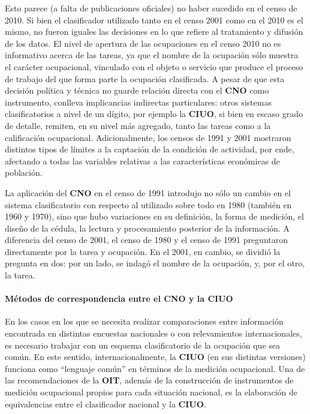 \documentclass[
]{book}
\begin{document}
Esto parece (a falta de publicaciones oficiales) no haber sucedido en el censo de 2010. Si bien el clasificador utilizado tanto en el censo 2001 como en el 2010 es el mismo, no fueron iguales las decisiones en lo que refiere al tratamiento y difusión de los datos. El nivel de apertura de las ocupaciones en el censo 2010 no es informativo acerca de las tareas, ya que el nombre de la ocupación sólo muestra el carácter ocupacional, vinculado con el objeto o servicio que produce el proceso de trabajo del que forma parte la ocupación clasificada. A pesar de que esta decisión política y técnica no guarde relación directa con el \textbf{CNO} como instrumento, conlleva implicancias indirectas particulares: otros sistemas clasificatorios a nivel de un dígito, por ejemplo la \textbf{CIUO}, si bien en escaso grado de detalle, remiten, en su nivel más agregado, tanto las tareas como a la calificación ocupacional. Adicionalmente, los censos de 1991 y 2001 mostraron distintos tipos de límites a la captación de la condición de actividad, por ende, afectando a todas las variables relativas a las características económicas de población.

La aplicación del \textbf{CNO} en el censo de 1991 introdujo no sólo un cambio en el sistema clasificatorio con respecto al utilizado sobre todo en 1980 (también en 1960 y 1970), sino que hubo variaciones en su definición, la forma de medición, el diseño de la cédula, la lectura y procesamiento posterior de la información. A diferencia del censo de 2001, el censo de 1980 y el censo de 1991 preguntaron directamente por la tarea y ocupación. En el 2001, en cambio, se dividió la pregunta en dos: por un lado, se indagó el nombre de la ocupación, y, por el otro, la tarea.

\hypertarget{muxe9todos-de-correspondencia-entre-el-cno-y-la-ciuo}{%
\paragraph{Métodos de correspondencia entre el CNO y la CIUO}\label{muxe9todos-de-correspondencia-entre-el-cno-y-la-ciuo}}

En los casos en los que se necesita realizar comparaciones entre información encontrada en distintas encuestas nacionales o con relevamientos internacionales, es necesario trabajar con un esquema clasificatorio de la ocupación que sea común. En este sentido, internacionalmente, la \textbf{CIUO} (en sus distintas versiones) funciona como ``lenguaje común'' en términos de la medición ocupacional. Una de las recomendaciones de la \textbf{OIT}, además de la construcción de instrumentos de medición ocupacional propios para cada situación nacional, es la elaboración de equivalencias entre el clasificador nacional y la \textbf{CIUO}.
\end{document}
